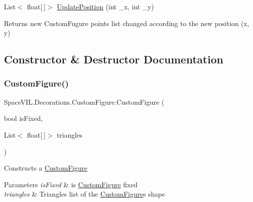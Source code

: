 \begin{DoxyCompactItemize}
List$<$ float\mbox{[}$\,$\mbox{]}$>$ \mbox{\hyperlink{class_space_v_i_l_1_1_decorations_1_1_custom_figure_adb4c9e835ae9daf135f21c8c7133f99c}{Update\+Position}} (int \+\_\+x, int \+\_\+y)
\begin{DoxyCompactList}\small\item\em \begin{DoxyReturn}{Returns}
new Custom\+Fugure points list changed according to the new position (x, y) 
\end{DoxyReturn}
\end{DoxyCompactList}\end{DoxyCompactItemize}


\subsection{Constructor \& Destructor Documentation}
\mbox{\label{class_space_v_i_l_1_1_decorations_1_1_custom_figure_a0177c625ad2cf4b4ea3295b81cfd348b}} 
\subsubsection{\texorpdfstring{Custom\+Figure()}{CustomFigure()}}
{\footnotesize\ttfamily Space\+V\+I\+L.\+Decorations.\+Custom\+Figure.\+Custom\+Figure (\begin{DoxyParamCaption}\item[{bool}]{is\+Fixed,  }\item[{List$<$ float\mbox{[}$\,$\mbox{]}$>$}]{triangles }\end{DoxyParamCaption})}



Constructs a \mbox{\hyperlink{class_space_v_i_l_1_1_decorations_1_1_custom_figure}{Custom\+Figure}} 


\begin{DoxyParams}{Parameters}
{\em is\+Fixed} & is \mbox{\hyperlink{class_space_v_i_l_1_1_decorations_1_1_custom_figure}{Custom\+Figure}} fixed \\
\hline
{\em triangles} & Triangles list of the \mbox{\hyperlink{class_space_v_i_l_1_1_decorations_1_1_custom_figure}{Custom\+Figure}}\textquotesingle{}s shape \\
\hline
\end{DoxyParams}


